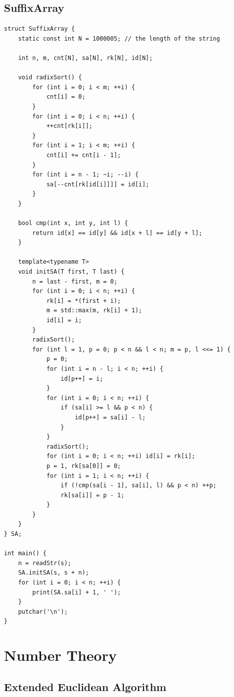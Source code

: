 \documentclass[9pt,landscape]{article}
\begin{document}
\begin{multicols}{2}
\subsection{SuffixArray}
\begin{lstlisting}
struct SuffixArray {
    static const int N = 1000005; // the length of the string

    int n, m, cnt[N], sa[N], rk[N], id[N];

    void radixSort() {
        for (int i = 0; i < m; ++i) {
            cnt[i] = 0;
        }
        for (int i = 0; i < n; ++i) {
            ++cnt[rk[i]];
        }
        for (int i = 1; i < m; ++i) {
            cnt[i] += cnt[i - 1];
        }
        for (int i = n - 1; ~i; --i) {
            sa[--cnt[rk[id[i]]]] = id[i];
        }
    }

    bool cmp(int x, int y, int l) {
        return id[x] == id[y] && id[x + l] == id[y + l];
    }

    template<typename T>
    void initSA(T first, T last) {
        n = last - first, m = 0;
        for (int i = 0; i < n; ++i) {
            rk[i] = *(first + i);
            m = std::max(m, rk[i] + 1);
            id[i] = i;
        }
        radixSort();
        for (int l = 1, p = 0; p < n && l < n; m = p, l <<= 1) {
            p = 0;
            for (int i = n - l; i < n; ++i) {
                id[p++] = i;
            }
            for (int i = 0; i < n; ++i) {
                if (sa[i] >= l && p < n) {
                    id[p++] = sa[i] - l;
                }
            }
            radixSort();
            for (int i = 0; i < n; ++i) id[i] = rk[i];
            p = 1, rk[sa[0]] = 0;
            for (int i = 1; i < n; ++i) {
                if (!cmp(sa[i - 1], sa[i], l) && p < n) ++p;
                rk[sa[i]] = p - 1;
            }
        }
    }
} SA;

int main() {
    n = readStr(s);
    SA.initSA(s, s + n);
    for (int i = 0; i < n; ++i) {
        print(SA.sa[i] + 1, ' ');
    }
    putchar('\n');
}
\end{lstlisting}

\section{Number Theory}

\subsection{Extended Euclidean Algorithm}


\end{multicols}
\end{document}
